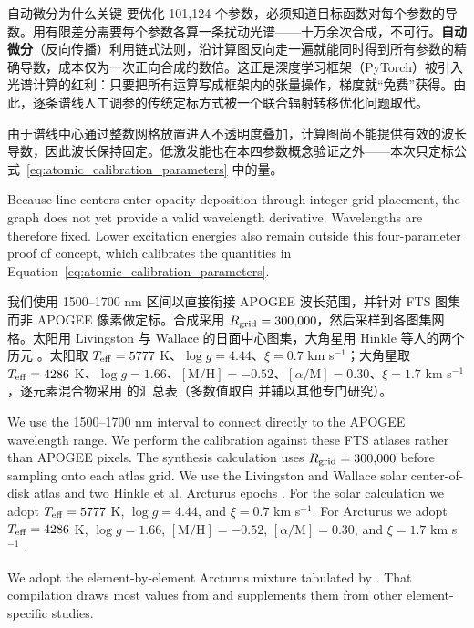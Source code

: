 \begin{physbox}{自动微分为什么关键}
要优化 101,124 个参数，必须知道目标函数对每个参数的导数。用有限差分需要每个参数各算一条扰动光谱——十万余次合成，不可行。\textbf{自动微分}（反向传播）利用链式法则，沿计算图反向走一遍就能同时得到所有参数的精确导数，成本仅为一次正向合成的数倍。这正是深度学习框架（PyTorch）被引入光谱计算的红利：只要把所有运算写成框架内的张量操作，梯度就“免费”获得。由此，逐条谱线人工调参的传统定标方式被一个联合辐射转移优化问题取代。
\end{physbox}

由于谱线中心通过整数网格放置进入不透明度叠加，计算图尚不能提供有效的波长导数，因此波长保持固定。低激发能也在本四参数概念验证之外——本次只定标公式~\ref{eq:atomic_calibration_parameters} 中的量。

\begin{EN}
Because line centers enter opacity deposition through integer grid placement,
the graph does not yet provide a valid wavelength derivative. Wavelengths are
therefore fixed. Lower excitation energies also remain outside this
four-parameter proof of concept, which calibrates the quantities in
Equation~\ref{eq:atomic_calibration_parameters}.
\end{EN}

我们使用 1500--1700 nm 区间以直接衔接 APOGEE 波长范围，并针对 FTS 图集而非 APOGEE 像素做定标。合成采用 $R_{\rm grid}=300{,}000$，然后采样到各图集网格。太阳用 Livingston 与 Wallace 的日面中心图集，大角星用 Hinkle 等人的两个历元 \citep{LivingstonWallace1991,Hinkle1995,Smith2021}。太阳取 $T_{\rm eff}=5777$ K、$\log g=4.44$、$\xi=0.7$ km s$^{-1}$；大角星取 $T_{\rm eff}=4286$ K、$\log g=1.66$、$[\mathrm{M}/\mathrm{H}]=-0.52$、$[\alpha/\mathrm{M}]=0.30$、$\xi=1.7$ km s$^{-1}$ \citep{Ramirez2011,Smith2021}，逐元素混合物采用 \citet{Smith2021} 的汇总表（多数值取自 \citet{Ramirez2011} 并辅以其他专门研究）。

\begin{EN}
We use the 1500--1700 nm interval to connect directly to the APOGEE wavelength
range. We perform the calibration against these FTS atlases rather than APOGEE
pixels. The synthesis calculation uses
$R_{\rm grid}=300{,}000$ before sampling onto each atlas grid. We use the
Livingston and Wallace solar center-of-disk atlas and two Hinkle et al.
Arcturus epochs \citep{LivingstonWallace1991,Hinkle1995,Smith2021}. For the
solar calculation we adopt $T_{\rm eff}=5777$ K,
$\log g=4.44$, and $\xi=0.7$ km s$^{-1}$. For Arcturus we adopt
$T_{\rm eff}=4286$ K, $\log g=1.66$, $[\mathrm{M}/\mathrm{H}]=-0.52$,
$[\alpha/\mathrm{M}]=0.30$, and $\xi=1.7$ km s$^{-1}$
\citep{Ramirez2011,Smith2021}.

We adopt the
element-by-element Arcturus mixture tabulated by
\citet{Smith2021}. That compilation draws most values from
\citet{Ramirez2011} and supplements them from other element-specific
studies.
\end{EN}

